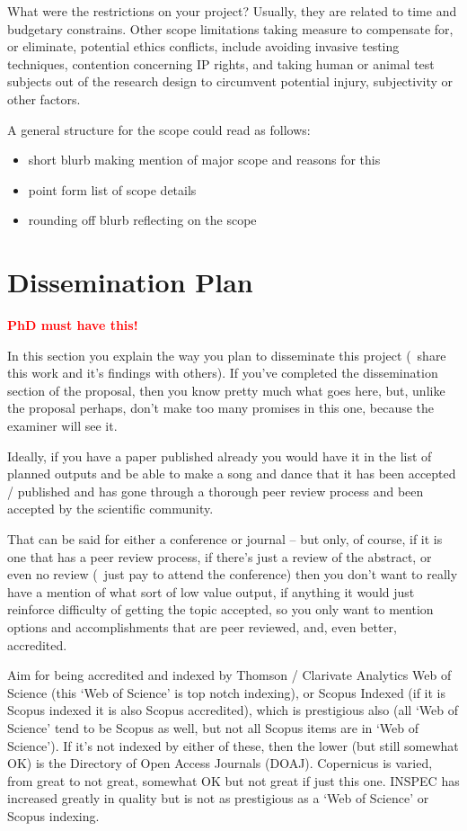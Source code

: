 What were the restrictions on your project?  Usually, they are related to time and budgetary constrains.  Other scope limitations taking measure to compensate for, or eliminate, potential ethics conflicts, include avoiding invasive testing techniques, contention concerning IP rights, and taking human or animal test subjects out of the research design to circumvent potential injury, subjectivity or other factors.

A general structure for the scope could read as follows:

\begin{itemize}
  \item short blurb making mention of major scope and reasons for this
  \item point form list of scope details
  \item rounding off blurb reflecting on the scope
\end{itemize}
 
\section{Dissemination Plan}

\textbf{\textcolor{red}{PhD must have this!}}

In this section you explain the way you plan to disseminate this project (\ie~share this work and it's findings with others). If you've completed the dissemination section of the proposal, then you know pretty much what goes here, but, unlike the proposal perhaps, don't make too many promises in this one, because the examiner will see it.

Ideally, if you have a paper published already you would have it in the list of planned outputs and be able to make a song and dance that it has been accepted / published and has gone through a thorough peer review process and been accepted by the scientific community.

That can be said for either a conference or journal -- but only, of course, if it is one that has a peer review process, if there's just a review of the abstract, or even no review (\ie~just pay to attend the conference) then you don't want to really have a mention of what sort of low value output, if anything it would just reinforce difficulty of getting the topic accepted, so you only want to mention options and accomplishments that are peer reviewed, and, even better, accredited.

Aim for being accredited and indexed by Thomson / Clarivate Analytics Web of Science (this `Web of Science' is top notch indexing), or Scopus Indexed (if it is Scopus indexed it is also Scopus accredited), which is prestigious also (all `Web of Science' tend to be Scopus as well, but not all Scopus items are in `Web of Science').  If it's not indexed by either of these, then the lower (but still somewhat OK) is the Directory of Open Access Journals (DOAJ). Copernicus is varied, from great to not great, somewhat OK but not great if just this one. INSPEC has increased greatly in quality but is not as prestigious as a `Web of Science' or Scopus indexing.

